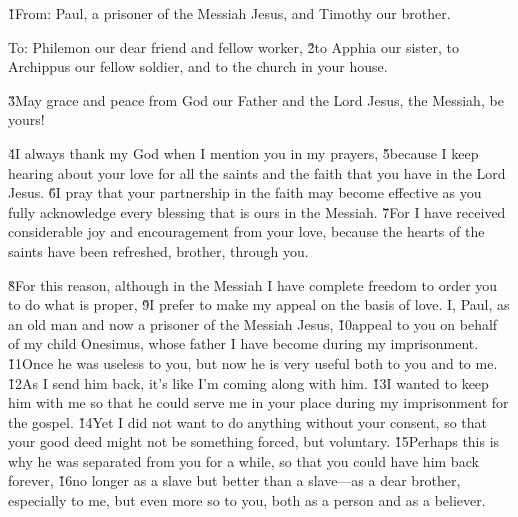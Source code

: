 


\v{1}From: Paul, a prisoner of the Messiah Jesus, and Timothy our brother.

To: Philemon our dear friend and fellow worker, \v{2}to Apphia our sister, to Archippus our fellow soldier, and to the church in your house.

\v{3}May grace and peace from God our Father and the Lord Jesus, the Messiah, be yours!

\v{4}I always thank my God when I mention you in my prayers, \v{5}because I keep hearing about your love for all the saints and the faith that you have in the Lord Jesus. \v{6}I pray that your partnership in the faith may become effective as you fully acknowledge every blessing that is ours in the Messiah. \v{7}For I have received considerable joy and encouragement from your love, because the hearts of the saints have been refreshed, brother, through you.

\v{8}For this reason, although in the Messiah I have complete freedom to order you to do what is proper, \v{9}I prefer to make my appeal on the basis of love. I, Paul, as an old man and now a prisoner of the Messiah Jesus, \v{10}appeal to you on behalf of my child Onesimus, whose father I have become during my imprisonment. \v{11}Once he was useless to you, but now he is very useful both to you and to me. \v{12}As I send him back, it's like I'm coming along with him. \v{13}I wanted to keep him with me so that he could serve me in your place during my imprisonment for the gospel. \v{14}Yet I did not want to do anything without your consent, so that your good deed might not be something forced, but voluntary. \v{15}Perhaps this is why he was separated from you for a while, so that you could have him back forever, \v{16}no longer as a slave but better than a slave---as a dear brother, especially to me, but even more so to you, both as a person and as a believer.

